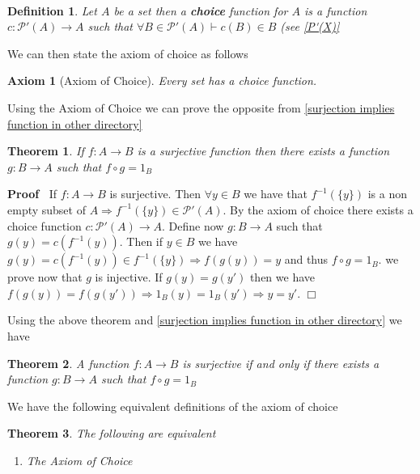 \documentclass{book}
\newcommand{\tmtextbf}[1]{{\bfseries{#1}}}
\newenvironment{proof}{\noindent\textbf{Proof\ }}{\hspace*{\fill}$\Box$\medskip}
\newtheorem{axiom}{Axiom}
\newtheorem{definition}{Definition}
{\theorembodyfont{\rmfamily}\newtheorem{example}{Example}}
\newtheorem{theorem}{Theorem}
\begin{document}
{{\

\begin{definition}
  Let $A$ be a set then a \tmtextbf{choice} function for $A$ is a function $c
  : \mathcal{P}' (A) \rightarrow A$ such that $\forall B \in \mathcal{P}' (A)
  \vdash c (B) \in B$ (see \ref{P'(X)}
\end{definition}

We can then state the axiom of choice as follows

\begin{axiom}[Axiom of Choice]
  \label{axiom of choice}{}Every set has a choice
  function.
\end{axiom}

Using the Axiom of Choice we can prove the opposite from \ref{surjection
implies function in other directory}

\begin{theorem}
  \label{surjective function implies injective function in opposite
  direction}If $f : A \rightarrow B$ is a surjective function then there
  exists a function $g : B \rightarrow A$ such that $f \circ g = 1_B$
\end{theorem}

\begin{proof}
  If $f : A \rightarrow B$ is surjective. Then $\forall y \in B$ we have that
  $f^{- 1} (\{ y \})$ is a non empty subset of $A \Rightarrow f^{- 1} (\{ y
  \}) \in \mathcal{P}' (A)$. By the axiom of choice there exists a choice
  function $c : \mathcal{P}' (A) \rightarrow A$. Define now $g : B \rightarrow
  A$ such that $g (y) = c (f^{- 1} (y))$. Then if $y \in B$ we have $g (y) = c
  (f^{- 1} (y)) \in f^{- 1} (\{ y \}) \Rightarrow f (g (y)) = y$ and thus $f
  \circ g = 1_B .$ we prove now that $g$ is injective. If $g (y) = g (y')$
  then we have $f (g (y)) = f (g (y')) \Rightarrow 1_B (y) = 1_B (y')
  \Rightarrow y = y'$.
\end{proof}

Using the above theorem and \ref{surjection implies function in other
directory} we have

\begin{theorem}
  A function $f : A \rightarrow B$ is surjective if and only if there exists a
  function $g : B \rightarrow A$ such that $f \circ g = 1_B$
\end{theorem}

We have the following equivalent definitions of the axiom of choice

\begin{theorem}
  \label{equivalences of axiom of choice}The following are equivalent
  \begin{enumerate}
    \item The Axiom of Choice
    

\end{enumerate}
\end{theorem}}}
\end{document}
